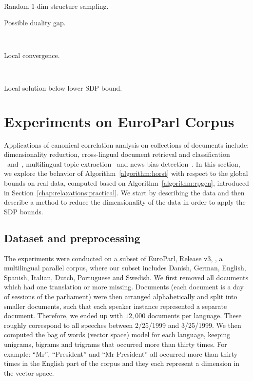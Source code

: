 \begin{table}[t]
  \caption{Random 1-dim structure sampling.}
    \begin{subtable}[t]{.5\textwidth}
        \centering
        \caption{Possible duality gap.}
        
        \label{tb:r1d_dg}
    \end{subtable}
    ~
    \begin{subtable}[t]{.5\textwidth}
        \centering
        \caption{Local convergence.}
        
        \label{tb:r1d_lc}
    \end{subtable}
    ~
    \begin{subtable}[t]{\textwidth}
        \centering
        \caption{Local solution below lower SDP bound.}
        
        \label{tb:r1d_lb}
    \end{subtable}
  \label{tb:r1d}
\end{table}

\section{Experiments on EuroParl Corpus}\label{subsec:documents}

Applications of canonical correlation analysis on collections of
documents include: dimensionality reduction, cross-lingual document retrieval and classification~
\cite{mrpqr}~and~\cite{ccatextdva}, multilingual topic extraction~\cite{mcca} and news bias detection~\cite{ccanewsbias}.
In this section, we explore the behavior of
Algorithm~\ref{algorithm:horst} with respect to the global
bounds on real data, computed based on Algorithm~\ref{algorithm:rpgen},
introduced in Section~\ref{chap:relaxations:practical}.
We start by describing the data and then describe a method to
reduce the dimensionality of the data in order to apply the SDP
bounds.

\subsection{Dataset and preprocessing}
The experiments were conducted on a subset of EuroParl, Release v3,
\cite{europarl}, a multilingual parallel corpus, where our subset
includes Danish, German, English, Spanish, Italian, Dutch,
Portuguese and Swedish. We first removed all documents
which had one translation or more missing. Documents (each
document is a day of sessions of the parliament) were then
arranged alphabetically and split into smaller documents, such that
each speaker instance represented a separate document.
Therefore, we ended up with $12,000$ documents per
language. These roughly correspond to all speeches between 2/25/1999
and 3/25/1999. We then computed the bag of words (vector space)
\cite{Salton88term-weightingapproaches} model for each language,
keeping unigrams, bigrams and trigrams that occurred
more than thirty times. For example: ``Mr'', ``President'' and
``Mr President'' all occurred more than thirty times in the
English part of the corpus and they each represent a dimension in
the vector space.

